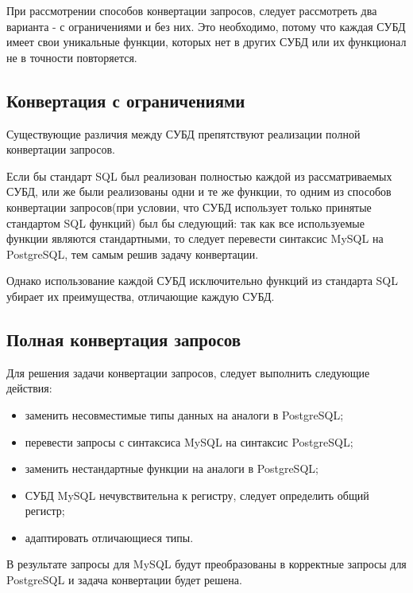 При рассмотрении способов конвертации запросов, следует рассмотреть два варианта - с ограничениями и без них. 
Это необходимо, потому что каждая СУБД имеет свои уникальные функции, которых нет в других СУБД или их функционал не в точности повторяется.

\subsection{Конвертация с ограничениями}
Существующие различия между СУБД препятствуют реализации полной конвертации запросов.

Если бы стандарт SQL был реализован полностью каждой из рассматриваемых СУБД, или же были реализованы
одни и те же функции, то одним из способов конвертации запросов(при условии, что СУБД 
использует только принятые стандартом SQL функций) был бы следующий:  
так как все используемые функции являются стандартными, то следует перевести синтаксис MySQL на PostgreSQL,
тем самым решив задачу конвертации.

Однако использование каждой СУБД исключительно функций из стандарта SQL убирает их преимущества, 
отличающие каждую СУБД.

\subsection{Полная конвертация запросов}
Для решения задачи конвертации запросов, следует выполнить следующие действия:
\begin{itemize}
    \item заменить несовместимые типы данных на аналоги в PostgreSQL;
    \item перевести запросы с синтаксиса MySQL на синтаксис PostgreSQL;
    \item заменить нестандартные функции на аналоги в PostgreSQL;
    \item СУБД MySQL нечувствительна к регистру, следует определить общий регистр;
    \item адаптировать отличающиеся типы.
\end{itemize} 

В результате запросы для MySQL будут преобразованы в корректные запросы для PostgreSQL и задача конвертации будет решена. 
